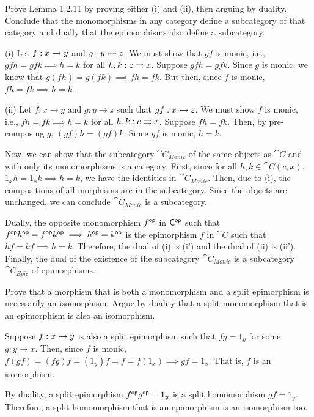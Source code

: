 \documentclass[notes,tikz]{agony}
\begin{document}
\begin{xca}
  Prove Lemma 1.2.11 by proving either (i) and (ii), then arguing by duality.
  Conclude that the monomorphisms in any category define a subcategory of that category
  and dually that the epimorphisms also define a subcategory.
\end{xca}
\begin{prf}
  (i) Let $f : x \rightarrowtail y$ and $g : y \rightarrowtail z$.
  We must show that $gf$ is monic, i.e.,
  $gfh = gfk \implies h = k$ for all $h,k : c \rightrightarrows x$.
  Suppose $gfh = gfk$.
  Since $g$ is monic, we know that $g(fh) = g(fk) \implies fh = fk$.
  But then, since $f$ is monic, $fh = fk \implies h = k$.

  (ii) Let $f : x \to y$ and $g : y \to z$ such that $gf : x \rightarrowtail z$.
  We must show $f$ is monic, i.e., $fh = fk \implies h = k$ for all $h,k : c \rightrightarrows x$.
  Suppose $fh = fk$.
  Then, by pre-composing $g$, $(gf)h = (gf)k$.
  Since $gf$ is monic, $h = k$.

  Now, we can show that the subcategory $\cat{C_{Monic}}$ of the same objects
  as $\cat C$ and with only its monomorphisms is a category.
  First, since for all $h,k \in \cat C(c,x)$,
  $1_xh = 1_xk \implies h = k$, we have the identities in $\cat{C_{Monic}}$.
  Then, due to (i), the compositions of all morphisms are in the subcategory.
  Since the objects are unchanged, we can conclude $\cat{C_{Monic}}$ is a subcategory.

  Dually, the opposite monomorphism $f^{\mathsf{op}}$ in $\mathsf{C}^{\mathsf{op}}$ such that
  $f^{\mathsf{op}} h^{\mathsf{op}} = f^{\mathsf{op}} k^{\mathsf{op}} \implies h^{\mathsf{op}} = k^{\mathsf{op}}$ is the epimorphism
  $f$ in $\cat C$ such that $hf = kf \implies h = k$.
  Therefore, the dual of (i) is (i') and the dual of (ii) is (ii').
  Finally, the dual of the existence of the subcategory $\cat{C_{Monic}}$
  is a subcategory $\cat{C_{Epic}}$ of epimorphisms.
\end{prf}

\begin{xca}
  Prove that a morphism that is both a monomorphism
  and a split epimorphism is necessarily an isomorphism.
  Argue by duality that a split monomorphism that is
  an epimorphism is also an isomorphism.
\end{xca}
\begin{prf}
  Suppose $f : x \rightarrowtail y$ is also a split epimorphism such that $fg = 1_y$ for some $g : y \to x$.
  Then, since $f$ is monic, $f(gf) = (fg)f = (1_y)f = f = f(1_x) \implies gf = 1_x$.
  That is, $f$ is an isomorphism.

  By duality, a split epimorphism $f^{\mathsf{op}} g^{\mathsf{op}} = 1_y$ is a split homomorphism $gf = 1_y$.
  Therefore, a split homomorphism that is an epimorphism is an isomorphism too.
\end{prf}
\end{document}
